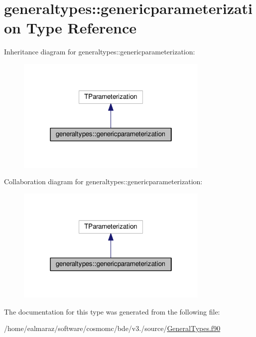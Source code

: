 \hypertarget{structgeneraltypes_1_1genericparameterization}{}\section{generaltypes\+:\+:genericparameterization Type Reference}
\label{structgeneraltypes_1_1genericparameterization}


Inheritance diagram for generaltypes\+:\+:genericparameterization\+:
\nopagebreak
\begin{figure}[H]
\begin{center}
\leavevmode
\includegraphics[width=262pt]{structgeneraltypes_1_1genericparameterization__inherit__graph}
\end{center}
\end{figure}


Collaboration diagram for generaltypes\+:\+:genericparameterization\+:
\nopagebreak
\begin{figure}[H]
\begin{center}
\leavevmode
\includegraphics[width=262pt]{structgeneraltypes_1_1genericparameterization__coll__graph}
\end{center}
\end{figure}


The documentation for this type was generated from the following file\+:\begin{DoxyCompactItemize}
\item 
/home/ealmaraz/software/cosmomc/bde/v3./source/\mbox{\hyperlink{GeneralTypes_8f90}{General\+Types.\+f90}}\end{DoxyCompactItemize}
